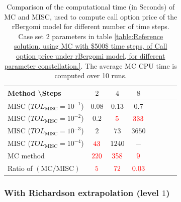 \begin{table}[htbp]
	\centering
	\begin{tabular}{l*{6}{c}r}
		Method \textbackslash  Steps            & $2$ & $4$ & $8$   \\
		\hline
		MISC ($TOL_{\text{MISC}}=10^{-1}$)  & $0.08$ & $0.13$ & $0.7$   \\
		MISC ($TOL_{\text{MISC}}=10^{-2}$)  & $0.2$& ${\color{red}5}$ & ${\color{red}333}$   \\
		MISC ($TOL_{\text{MISC}}=10^{-3}$)  &  $2$ & $73$ & $3650$  \\		
		MISC ($TOL_{\text{MISC}}=10^{-4}$)  & ${\color{red}43}$ & $1240$ & $-$  \\	
	
		\hline
		MC method & ${\color{red}220}$  & ${\color{red}358}$  & ${\color{red}9}$  \\
		\hline	
		Ratio of $\left(\text{MC}/ \text{MISC} \right)$  &${\color{red}5}$ & ${\color{red}   72 
		}$  & ${\color{red}  0.03	}$   \\
		\hline
	\end{tabular}
	\caption{Comparison of the computational time (in Seconds) of  MC and MISC, used to compute call option price of the rBergomi model for different number of time steps. Case  set $2$ parameters in table \ref{table:Reference solution, using MC with $500$ time steps, of Call option price under rBergomi model, for different parameter constellation.}. The
		average MC CPU time is computed over 10 runs.}
	\label{Comparsion of the computational time of  MC and MISC, used to compute Call option price of rBergomi model for different number of time steps. Case $K=1, H=0.07$, linear}
\end{table}
\FloatBarrier
\subsubsection*{With Richardson extrapolation (level $1$)}

